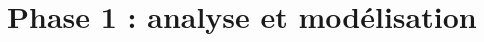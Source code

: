 \documentclass[11pt,a4paper]{article}
\begin{document}


\tableofcontents
\clearpage
{}

\section{Phase 1 : analyse et modélisation}


\clearpage


\clearpage


\clearpage


\clearpage


\clearpage


\clearpage
\end{document}
